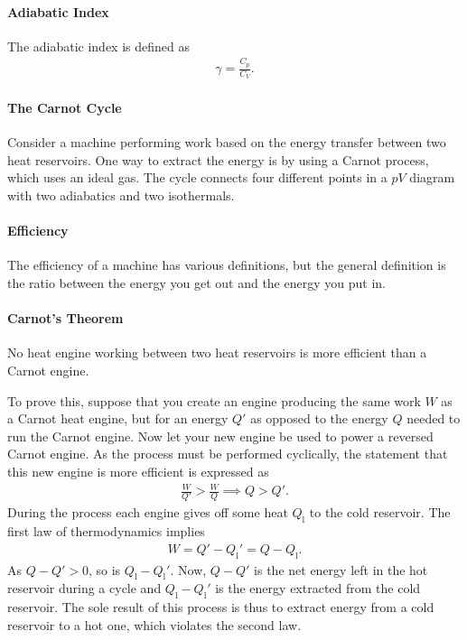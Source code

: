 \paragraph{Adiabatic Index}
The adiabatic index is defined as
\begin{align*}
	\gamma = \frac{C_{p}}{C_{V}}.
\end{align*}

\paragraph{The Carnot Cycle}
Consider a machine performing work based on the energy transfer between two heat reservoirs. One way to extract the energy is by using a Carnot process, which uses an ideal gas. The cycle connects four different points in a $pV$ diagram with two adiabatics and two isothermals.

\paragraph{Efficiency}
The efficiency of a machine has various definitions, but the general definition is the ratio between the energy you get out and the energy you put in.

\paragraph{Carnot's Theorem}
No heat engine working between two heat reservoirs is more efficient than a Carnot engine.

To prove this, suppose that you create an engine producing the same work $W$ as a Carnot heat engine, but for an energy $Q'$ as opposed to the energy $Q$ needed to run the Carnot engine. Now let your new engine be used to power a reversed Carnot engine. As the process must be performed cyclically, the statement that this new engine is more efficient is expressed as
\begin{align*}
	\frac{W}{Q'} > \frac{W}{Q} \implies Q > Q'.
\end{align*}
During the process each engine gives off some heat $Q_{\text{l}}$ to the cold reservoir. The first law of thermodynamics implies
\begin{align*}
	W = Q' - Q_{\text{l}}' = Q - Q_{\text{l}}.
\end{align*}
As $Q - Q' > 0$, so is $Q_{\text{l}} - Q_{\text{l}}'$. Now, $Q - Q'$ is the net energy left in the hot reservoir during a cycle and $Q_{\text{l}} - Q_{\text{l}}'$ is the energy extracted from the cold reservoir. The sole result of this process is thus to extract energy from a cold reservoir to a hot one, which violates the second law.

